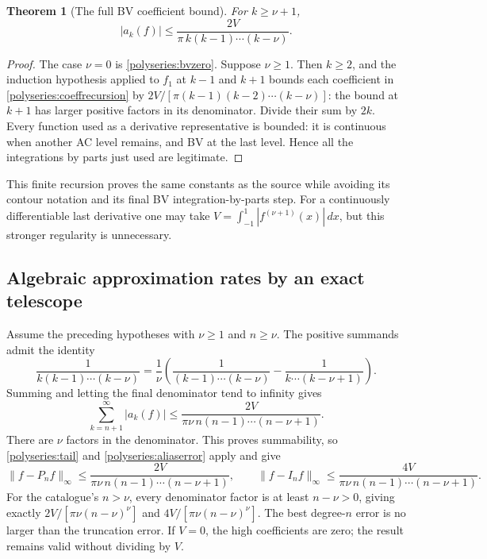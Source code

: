 \documentclass[11pt]{article}
\newtheorem{theorem}{Theorem}[section]
\theoremstyle{remark}
\numberwithin{equation}{section}
\begin{document}
\begin{theorem}[The full BV coefficient bound]\label{polyseries:bvtheorem}
For $k\ge\nu+1$,
\begin{equation}\label{polyseries:bvbound}
 |a_k(f)|\le\frac{2V}{\pi\,k(k-1)\cdots(k-\nu)}.
\end{equation}
\end{theorem}
\begin{proof}
The case $\nu=0$ is \eqref{polyseries:bvzero}. Suppose $\nu\ge1$.
Then $k\ge2$, and the induction hypothesis applied to $f_1$ at $k-1$
and $k+1$ bounds each coefficient in \eqref{polyseries:coeffrecursion}
by
$2V/[\pi(k-1)(k-2)\cdots(k-\nu)]$: the bound at $k+1$ has larger
positive factors in its denominator. Divide their sum by $2k$.
Every function used as a derivative representative is bounded: it is
continuous when another AC level remains, and BV at the last level.
Hence all the integrations by parts just used are legitimate.
\end{proof}
This finite recursion proves the same constants as the source while
avoiding its contour notation and its final BV integration-by-parts step.
For a continuously differentiable last derivative one may take
$V=\int_{-1}^1|f^{(\nu+1)}(x)|\,dx$, but this stronger regularity is
unnecessary.

\subsection{Algebraic approximation rates by an exact telescope}
\label{polyseries:differentiable}
Assume the preceding hypotheses with $\nu\ge1$ and $n\ge\nu$.
The positive summands admit the identity
\[
 \frac1{k(k-1)\cdots(k-\nu)}
 =\frac1\nu\left(
 \frac1{(k-1)\cdots(k-\nu)}-
 \frac1{k\cdots(k-\nu+1)}\right).
\]
Summing and letting the final denominator tend to infinity gives
\begin{equation}\label{polyseries:sharptail}
 \sum_{k=n+1}^\infty|a_k(f)|
 \le\frac{2V}{\pi\nu\,n(n-1)\cdots(n-\nu+1)}.
\end{equation}
There are $\nu$ factors in the denominator. This proves summability,
so \eqref{polyseries:tail} and \eqref{polyseries:aliaserror} apply and give
\[
 \|f-P_nf\|_\infty\le
 \frac{2V}{\pi\nu\,n(n-1)\cdots(n-\nu+1)},\qquad
 \|f-I_nf\|_\infty\le
 \frac{4V}{\pi\nu\,n(n-1)\cdots(n-\nu+1)}.
\]
For the catalogue's $n>\nu$, every denominator factor is at least
$n-\nu>0$, giving exactly $2V/[\pi\nu(n-\nu)^\nu]$ and
$4V/[\pi\nu(n-\nu)^\nu]$. The best degree-$n$ error is no larger
than the truncation error. If $V=0$, the high coefficients are zero;
the result remains valid without dividing by $V$.
\end{document}

